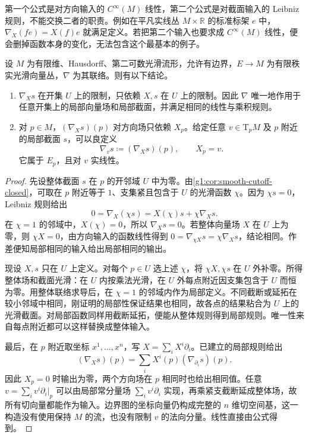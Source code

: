第一个公式是对方向输入的 \(C^\infty(M)\) 线性，第二个公式是对截面输入的 Leibniz 规则，不能交换二者的职责。例如在平凡实线丛 \(M\times\mathbb R\) 的标准标架 \(e\) 中，\(\nabla_X(fe)=X(f)e\) 就满足定义。若把第二个输入也要求成 \(C^\infty(M)\) 线性，便会删掉函数本身的变化，无法包含这个最基本的例子。

\begin{proposition}\label{g1:prop:connection-locality}
	设 \(M\) 为有限维、Hausdorff、第二可数光滑流形，允许有边界，\(E\to M\) 为有限秩实光滑向量丛，\(\nabla\) 为其联络。则有以下结论。
	\begin{enumerate}
		\item \(\nabla_Xs\) 在开集 \(U\) 上的限制，只依赖 \(X,s\) 在 \(U\) 上的限制。因此 \(\nabla\) 唯一地作用于任意开集上的局部向量场和局部截面，并满足相同的线性与乘积规则。
		\item 对 \(p\in M\)，\((\nabla_Xs)(p)\) 对方向场只依赖 \(X_p\)。给定任意 \(v\in \mathrm{T}_pM\) 及 \(p\) 附近的局部截面 \(s\)，可以良定义
		\[
			\nabla_v s\coloneqq(\nabla_Xs)(p),\qquad X_p=v.
		\]
		它属于 \(E_p\)，且对 \(v\) 实线性。
	\end{enumerate}
\end{proposition}
\begin{proof}
	先设整体截面 \(s\) 在 \(p\) 的开邻域 \(U\) 中为零。由\cref{g1:cor:smooth-cutoff-closed}，可取在 \(p\) 附近等于 \(1\)、支集紧且包含于 \(U\) 的光滑函数 \(\chi\)。因为 \(\chi s=0\)，Leibniz 规则给出
	\[
		0=\nabla_X(\chi s)=X(\chi)s+\chi\nabla_Xs.
	\]
	在 \(\chi=1\) 的邻域中，\(X(\chi)=0\)，所以 \(\nabla_Xs=0\)。若整体向量场 \(X\) 在 \(U\) 上为零，则 \(\chi X=0\)，由方向输入的函数线性得到 \(0=\nabla_{\chi X}s=\chi\nabla_Xs\)，结论相同。作差便知局部相同的输入给出局部相同的输出。

	现设 \(X,s\) 只在 \(U\) 上定义。对每个 \(p\in U\) 选上述 \(\chi\)，将 \(\chi X,\chi s\) 在 \(U\) 外补零。所得整体场和截面光滑：在 \(U\) 内按乘法光滑，在 \(U\) 外每点附近因支集包含于 \(U\) 而恒为零。用整体联络求导后，在 \(\chi=1\) 的邻域内作为局部定义。不同截断或延拓在较小邻域中相同，刚证明的局部性保证结果也相同，故各点的结果粘合为 \(U\) 上的光滑截面。对局部函数同样用截断延拓，便能从整体规则得到局部规则。唯一性来自每点附近都可以这样替换成整体输入。

	最后，在 \(p\) 附近取坐标 \(x^1,\ldots,x^n\)，写 \(X=\sum_iX^i\partial_i\)。已建立的局部规则给出
	\[
		(\nabla_Xs)(p)=\sum_iX^i(p)(\nabla_{\partial_i}s)(p).
	\]
	因此 \(X_p=0\) 时输出为零，两个方向场在 \(p\) 相同时也给出相同值。任意 \(v=\sum_iv^i\partial_i|_p\) 可以由局部常分量场 \(\sum_iv^i\partial_i\) 实现，再乘紧支截断延成整体场，故所有切向量都能作为输入。边界图的坐标向量仍构成完整的 \(n\) 维切空间基，这一构造没有使用保持 \(M\) 的流，也没有限制 \(v\) 的法向分量。线性直接由公式得到。
\end{proof}

